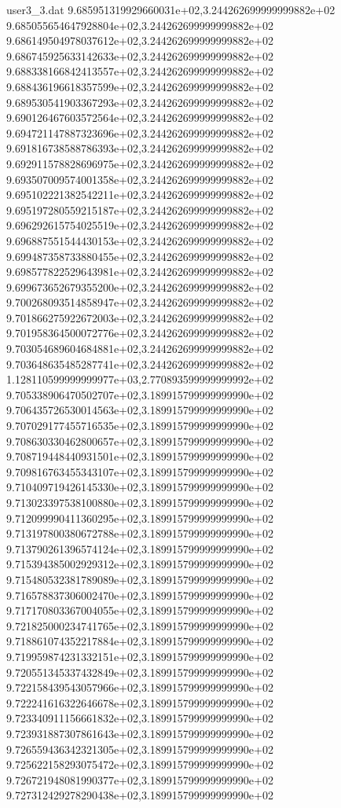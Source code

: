 \begin{filecontents}{user3_3.dat}
9.685951319929660031e+02,3.244262699999999882e+02
9.685055654647928804e+02,3.244262699999999882e+02
9.686149504978037612e+02,3.244262699999999882e+02
9.686745925633142633e+02,3.244262699999999882e+02
9.688338166842413557e+02,3.244262699999999882e+02
9.688436196618357599e+02,3.244262699999999882e+02
9.689530541903367293e+02,3.244262699999999882e+02
9.690126467603572564e+02,3.244262699999999882e+02
9.694721147887323696e+02,3.244262699999999882e+02
9.691816738588786393e+02,3.244262699999999882e+02
9.692911578828696975e+02,3.244262699999999882e+02
9.693507009574001358e+02,3.244262699999999882e+02
9.695102221382542211e+02,3.244262699999999882e+02
9.695197280559215187e+02,3.244262699999999882e+02
9.696292615754025519e+02,3.244262699999999882e+02
9.696887551544430153e+02,3.244262699999999882e+02
9.699487358733880455e+02,3.244262699999999882e+02
9.698577822529643981e+02,3.244262699999999882e+02
9.699673652679355200e+02,3.244262699999999882e+02
9.700268093514858947e+02,3.244262699999999882e+02
9.701866275922672003e+02,3.244262699999999882e+02
9.701958364500072776e+02,3.244262699999999882e+02
9.703054689604684881e+02,3.244262699999999882e+02
9.703648635485287741e+02,3.244262699999999882e+02
1.128110599999999977e+03,2.770893599999999992e+02
9.705338906470502707e+02,3.189915799999999990e+02
9.706435726530014563e+02,3.189915799999999990e+02
9.707029177455716535e+02,3.189915799999999990e+02
9.708630330462800657e+02,3.189915799999999990e+02
9.708719448440931501e+02,3.189915799999999990e+02
9.709816763455343107e+02,3.189915799999999990e+02
9.710409719426145330e+02,3.189915799999999990e+02
9.713023397538100880e+02,3.189915799999999990e+02
9.712099990411360295e+02,3.189915799999999990e+02
9.713197800380672788e+02,3.189915799999999990e+02
9.713790261396574124e+02,3.189915799999999990e+02
9.715394385002929312e+02,3.189915799999999990e+02
9.715480532381789089e+02,3.189915799999999990e+02
9.716578837306002470e+02,3.189915799999999990e+02
9.717170803367004055e+02,3.189915799999999990e+02
9.721825000234741765e+02,3.189915799999999990e+02
9.718861074352217884e+02,3.189915799999999990e+02
9.719959874231332151e+02,3.189915799999999990e+02
9.720551345337432849e+02,3.189915799999999990e+02
9.722158439543057966e+02,3.189915799999999990e+02
9.722241616322646678e+02,3.189915799999999990e+02
9.723340911156661832e+02,3.189915799999999990e+02
9.723931887307861643e+02,3.189915799999999990e+02
9.726559436342321305e+02,3.189915799999999990e+02
9.725622158293075472e+02,3.189915799999999990e+02
9.726721948081990377e+02,3.189915799999999990e+02
9.727312429278290438e+02,3.189915799999999990e+02

\end{filecontents}

